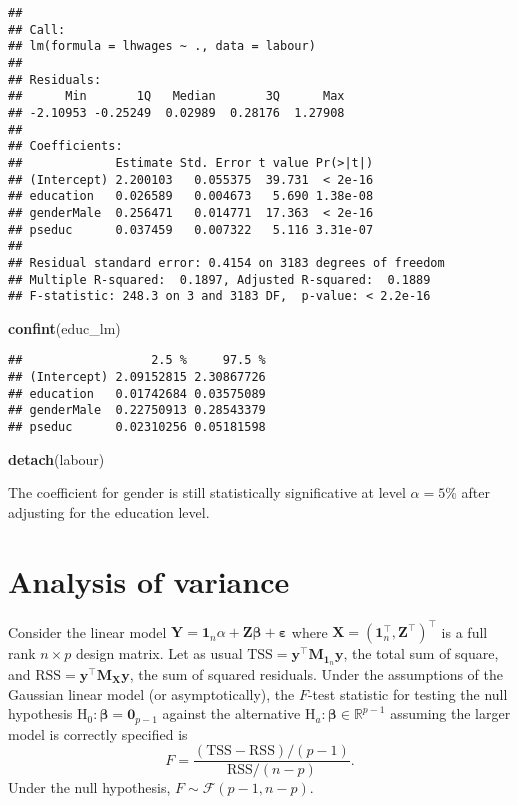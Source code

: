 \documentclass[]{book}
\newenvironment{Shaded}{\begin{snugshade}}{\end{snugshade}}
\newcommand{\KeywordTok}[1]{\textcolor[rgb]{0.13,0.29,0.53}{\textbf{#1}}}
\newcommand{\NormalTok}[1]{#1}
\theoremstyle{definition}
\theoremstyle{definition}
\theoremstyle{definition}
\theoremstyle{remark}
\begin{document}
\begin{verbatim}
## 
## Call:
## lm(formula = lhwages ~ ., data = labour)
## 
## Residuals:
##      Min       1Q   Median       3Q      Max 
## -2.10953 -0.25249  0.02989  0.28176  1.27908 
## 
## Coefficients:
##             Estimate Std. Error t value Pr(>|t|)
## (Intercept) 2.200103   0.055375  39.731  < 2e-16
## education   0.026589   0.004673   5.690 1.38e-08
## genderMale  0.256471   0.014771  17.363  < 2e-16
## pseduc      0.037459   0.007322   5.116 3.31e-07
## 
## Residual standard error: 0.4154 on 3183 degrees of freedom
## Multiple R-squared:  0.1897, Adjusted R-squared:  0.1889 
## F-statistic: 248.3 on 3 and 3183 DF,  p-value: < 2.2e-16
\end{verbatim}

\begin{Shaded}
\begin{Highlighting}[]
\KeywordTok{confint}\NormalTok{(educ_lm)}
\end{Highlighting}
\end{Shaded}

\begin{verbatim}
##                  2.5 %     97.5 %
## (Intercept) 2.09152815 2.30867726
## education   0.01742684 0.03575089
## genderMale  0.22750913 0.28543379
## pseduc      0.02310256 0.05181598
\end{verbatim}

\begin{Shaded}
\begin{Highlighting}[]
\KeywordTok{detach}\NormalTok{(labour)}
\end{Highlighting}
\end{Shaded}

The coefficient for gender is still statistically significative at level
\(\alpha=5\%\) after adjusting for the education level.

\hypertarget{analysis-of-variance}{%
\chapter{Analysis of variance}\label{analysis-of-variance}}

Consider the linear model
\(\boldsymbol{Y} = \mathbf{1}_n\alpha + \mathbf{Z}\boldsymbol{\beta} + \boldsymbol{\varepsilon}\)
where \(\mathbf{X}=(\mathbf{1}_n^\top, \mathbf{Z}^\top)^\top\) is a full
rank \(n \times p\) design matrix. Let as usual
\(\mathrm{TSS} = \boldsymbol{y}^\top\mathbf{M}_{\mathbf{1}_n}\boldsymbol{y}\),
the total sum of square, and
\(\mathrm{RSS}= \boldsymbol{y}^\top\mathbf{M}_{\mathbf{X}}\boldsymbol{y}\),
the sum of squared residuals. Under the assumptions of the Gaussian
linear model (or asymptotically), the \(F\)-test statistic for testing
the null hypothesis
\(\mathrm{H}_0: \boldsymbol{\beta}=\mathbf{0}_{p-1}\) against the
alternative \(\mathrm{H}_a: \boldsymbol{\beta} \in \mathbb{R}^{p-1}\)
assuming the larger model is correctly specified is
\[F = \frac{(\mathrm{TSS}-\mathrm{RSS})/(p-1)}{\mathrm{RSS}/(n-p)}.\]
Under the null hypothesis, \(F \sim \mathcal{F}(p-1, n-p)\).
\end{document}
